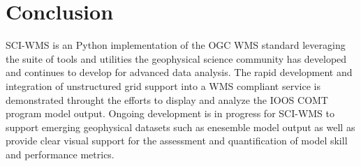 \documentclass[11pt,twocolumn,twoside]{IEEEtran}
\newcommand{\comt}{COMT}
\newcommand{\ioos}{IOOS}
\newcommand{\sciwms}{SCI-WMS}
\begin{document}
\section{Conclusion}
\sciwms{} is an Python implementation of the OGC WMS standard leveraging
the suite of tools and utilities the geophysical science community has developed and
continues to develop for advanced data analysis. The rapid development and integration
of unstructured grid support into a WMS compliant service is demonstrated throught the
efforts to display and analyze the \ioos{} \comt{} program model output. Ongoing development
is in progress for \sciwms{} to support emerging geophysical datasets such as enesemble model
output as well as provide clear visual support for the assessment and quantification of
model skill and performance metrics.



\end{document}
